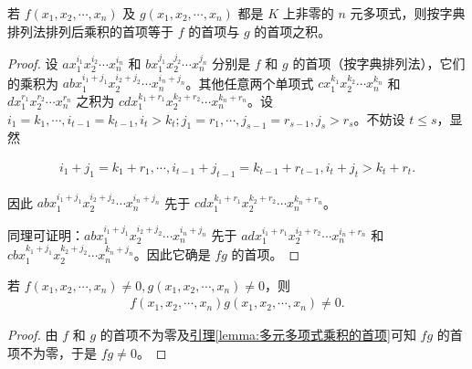 \documentclass[lang=cn,newtx,10pt,scheme=chinese]{elegantbook}
\begin{document}
\begin{lemma}\label{lemma:多元多项式乘积的首项}
若 $f(x_1, x_2, \cdots, x_n)$ 及 $g(x_1, x_2, \cdots, x_n)$ 都是 $K$ 上非零的 $n$ 元多项式，则按字典排列法排列后乘积的首项等于 $f$ 的首项与 $g$ 的首项之积。
\end{lemma}
\begin{proof}
设 $ax_1^{i_1} x_2^{i_2} \cdots x_n^{i_n}$ 和 $bx_1^{j_1} x_2^{j_2} \cdots x_n^{j_n}$ 分别是 $f$ 和 $g$ 的首项（按字典排列法），它们的乘积为 $abx_1^{i_1 + j_1} x_2^{i_2 + j_2} \cdots x_n^{i_n + j_n}$。其他任意两个单项式 $cx_1^{k_1} x_2^{k_2} \cdots x_n^{k_n}$ 和 $dx_1^{r_1} x_2^{r_2} \cdots x_n^{r_n}$ 之积为 $cdx_1^{k_1 + r_1} x_2^{k_2 + r_2} \cdots x_n^{k_n + r_n}$。设 $i_1 = k_1, \cdots, i_{t-1} = k_{t-1}, i_t > k_t; j_1 = r_1, \cdots, j_{s-1} = r_{s-1}, j_s > r_s$。不妨设 $t \leq s$，显然

\begin{align*}
i_1 + j_1 = k_1 + r_1, \cdots, i_{t-1} + j_{t-1} = k_{t-1} + r_{t-1}, i_t + j_t > k_t + r_t.
\end{align*}

因此 $abx_1^{i_1 + j_1} x_2^{i_2 + j_2} \cdots x_n^{i_n + j_n}$ 先于 $cdx_1^{k_1 + r_1} x_2^{k_2 + r_2} \cdots x_n^{k_n + r_n}$。

同理可证明：$abx_1^{i_1 + j_1} x_2^{i_2 + j_2} \cdots x_n^{i_n + j_n}$ 先于 $adx_1^{i_1 + r_1} x_2^{i_2 + r_2} \cdots x_n^{i_n + r_n}$ 和 $cbx_1^{k_1 + j_1} x_2^{k_2 + j_2} \cdots x_n^{k_n + j_n}$。因此它确是 $fg$ 的首项。
\end{proof}

\begin{proposition}[多元多项式的整性]\label{proposition:多元多项式的整性}
若 $f(x_1, x_2, \cdots, x_n) \neq 0, g(x_1, x_2, \cdots, x_n) \neq 0$，则
\begin{align*}
f(x_1, x_2, \cdots, x_n)g(x_1, x_2, \cdots, x_n) \neq 0.
\end{align*}
\end{proposition}
\begin{proof}
由 $f$ 和 $g$ 的首项不为零及\hyperref[lemma:多元多项式乘积的首项]{引理\ref{lemma:多元多项式乘积的首项}}可知 $fg$ 的首项不为零，于是 $fg \neq 0$。
\end{proof}
\end{document}
